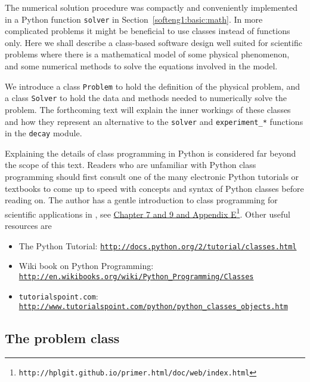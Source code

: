 \documentclass[graybox,sectrefs,envcountresetchap,open=right,final]{svmonodo}
\begin{document}
The numerical solution procedure was compactly and conveniently
implemented in a Python function \texttt{solver} in Section~\ref{softeng1:basic:math}.  In more complicated problems it might be
beneficial to use classes instead of functions only. Here we shall
describe a class-based software design well suited for scientific
problems where there is a mathematical model of some physical
phenomenon, and some numerical methods to solve the equations involved
in the model.

We introduce a class \texttt{Problem} to hold the definition of the physical
problem, and a class \texttt{Solver} to hold the data and methods needed to
numerically solve the problem.  The forthcoming text will explain the
inner workings of these classes and how they represent an alternative
to the \texttt{solver} and \Verb!experiment_*! functions in the \texttt{decay}
module.

Explaining the details of class programming in Python is considered
far beyond the scope of this text.  Readers who are unfamiliar with Python
class programming should first consult one of the many electronic
Python tutorials or textbooks to come up to speed with concepts and
syntax of Python classes before reading on. The author has a gentle
introduction to class programming for scientific applications
in \cite{Langtangen_2012}, see \href{{http://hplgit.github.io/primer.html/doc/web/index.html}}{Chapter 7 and 9 and Appendix E}\footnote{\texttt{http://hplgit.github.io/primer.html/doc/web/index.html}}.
Other useful resources are

\begin{itemize}
 \item The Python Tutorial: \href{{http://docs.python.org/2/tutorial/classes.html}}{\nolinkurl{http://docs.python.org/2/tutorial/classes.html}}

 \item Wiki book on Python Programming: \href{{http://en.wikibooks.org/wiki/Python_Programming/Classes}}{\nolinkurl{http://en.wikibooks.org/wiki/Python_Programming/Classes}}

 \item \texttt{tutorialspoint.com}: \href{{http://www.tutorialspoint.com/python/python_classes_objects.htm}}{\nolinkurl{http://www.tutorialspoint.com/python/python_classes_objects.htm}}
\end{itemize}

\noindent
\subsection{The problem class}
\end{document}
